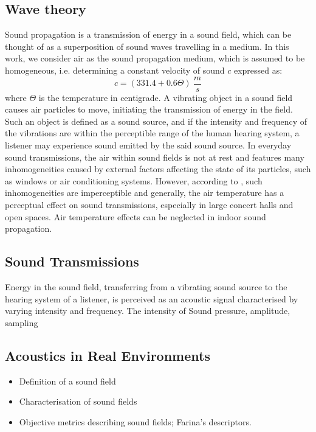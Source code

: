 \subsection{Wave theory}
Sound propagation is a transmission of energy in a sound field, which can be thought of as a superposition of sound waves travelling in a medium. In this work, we consider air as the sound propagation medium, which is assumed to be homogeneous, i.e. determining a constant velocity of sound $c$ expressed as: 
\begin{equation}
c = (331.4 + 0.6\Theta)~\frac{m}{s}   
\end{equation}
where $\Theta$ is the temperature in centigrade.
A vibrating object in a sound field causes air particles to move, initiating the transmission of energy in the field. Such an object is defined as a sound source, and if the intensity and frequency of the vibrations are within the perceptible range of the human hearing system, a listener may experience sound emitted by the said sound source.
In everyday sound transmissions, the air within sound fields is not at rest and features many inhomogeneities caused by external factors affecting the state of its particles, such as windows or air conditioning systems. However, according to \citep{kuttruff2016room}, such inhomogeneities are imperceptible and generally, the air temperature has a perceptual effect on sound transmissions, especially in large concert halls and open spaces. Air temperature effects can be neglected in indoor sound propagation.

\subsection{Sound Transmissions}
Energy in the sound field, transferring from a vibrating sound source to the hearing system of a listener, is perceived as an acoustic signal characterised by varying intensity and frequency. 
The intensity of 
Sound pressure, amplitude, sampling 

\subsection{Acoustics in Real Environments}
\begin{itemize}
    \item Definition of a sound field
    \item Characterisation of sound fields
    \item Objective metrics describing sound fields; Farina's descriptors.
    
\end{itemize}


